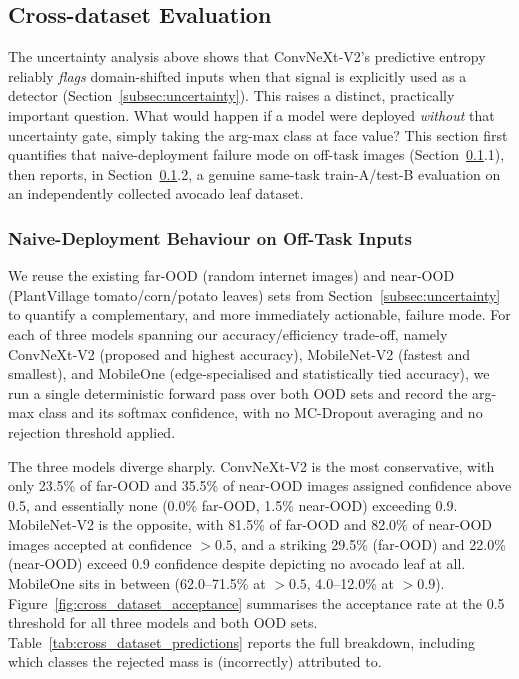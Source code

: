 \subsection{Cross-dataset Evaluation}
\label{subsec:cross_dataset}

The uncertainty analysis above shows that ConvNeXt‑V2's predictive entropy reliably \emph{flags} domain-shifted inputs when that signal is explicitly used as a detector (Section~\ref{subsec:uncertainty}). This raises a distinct, practically important question. What would happen if a model were deployed \emph{without} that uncertainty gate, simply taking the arg-max class at face value? This section first quantifies that naive-deployment failure mode on off-task images (Section~\ref{subsec:cross_dataset}.1), then reports, in Section~\ref{subsec:cross_dataset}.2, a genuine same-task train-A/test-B evaluation on an independently collected avocado leaf dataset.

\subsubsection{Naive-Deployment Behaviour on Off-Task Inputs}

We reuse the existing far-OOD (random internet images) and near-OOD (PlantVillage tomato/corn/potato leaves) sets from Section~\ref{subsec:uncertainty} to quantify a complementary, and more immediately actionable, failure mode. For each of three models spanning our accuracy/efficiency trade-off, namely ConvNeXt‑V2 (proposed and highest accuracy), MobileNet‑V2 (fastest and smallest), and MobileOne (edge-specialised and statistically tied accuracy), we run a single deterministic forward pass over both OOD sets and record the arg-max class and its softmax confidence, with no MC-Dropout averaging and no rejection threshold applied.

The three models diverge sharply. ConvNeXt‑V2 is the most conservative, with only 23.5\% of far-OOD and 35.5\% of near-OOD images assigned confidence above 0.5, and essentially none (0.0\% far-OOD, 1.5\% near-OOD) exceeding 0.9. MobileNet‑V2 is the opposite, with 81.5\% of far-OOD and 82.0\% of near-OOD images accepted at confidence $>0.5$, and a striking 29.5\% (far-OOD) and 22.0\% (near-OOD) exceed 0.9 confidence despite depicting no avocado leaf at all. MobileOne sits in between (62.0--71.5\% at $>0.5$, 4.0--12.0\% at $>0.9$). Figure~\ref{fig:cross_dataset_acceptance} summarises the acceptance rate at the 0.5 threshold for all three models and both OOD sets. Table~\ref{tab:cross_dataset_predictions} reports the full breakdown, including which classes the rejected mass is (incorrectly) attributed to.

